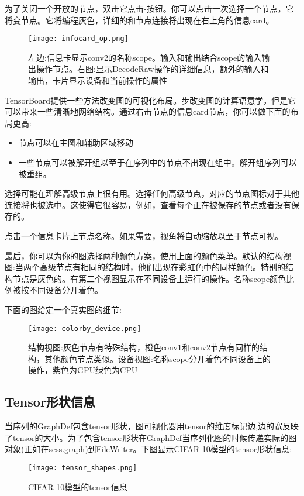 为了关闭一个开放的节点，双击它点击-按钮。你可以点击一次选择一个节点，它将变节点。它将编程灰色，详细的和节点连接将出现在右上角的信息card。
\begin{figure}[H]
\centering
\texttt{[image: infocard\_op.png]}
\caption{左边:信息卡显示conv2的名称scope。输入和输出结合scope的输入输出操作节点。右图:显示DecodeRaw操作的详细信息，额外的输入和输出，卡片显示设备和当前操作的属性}
\end{figure}
TensorBoard提供一些方法改变图的可视化布局。步改变图的计算语意学，但是它可以带来一些清晰地网络结构。通过右击节点的信息card节点，你可以做下面的布局更高:
\begin{itemize}
\item 节点可以在主图和辅助区域移动
\item 一些节点可以被解开组以至于在序列中的节点不出现在组中。解开组序列可以被重组。
\end{itemize}
选择可能在理解高级节点上很有用。选择任何高级节点，对应的节点图标对于其他连接将也被选中。这使得它很容易，例如，查看每个正在被保存的节点或者没有保存的。

点击一个信息卡片上节点名称。如果需要，视角将自动缩放以至于节点可视。

最后，你可以为你的图选择两种颜色方案，使用上面的颜色菜单。默认的结构视图:当两个高级节点有相同的结构时，他们出现在彩虹色中的同样颜色。特别的结构节点是灰色的。有第二个视图显示在不同设备上运行的操作。名称scope颜色比例被按不同设备分开着色。

下面的图给定一个真实图的细节:
\begin{figure}[H]
\centering
\texttt{[image: colorby\_device.png]}
\caption{结构视图:灰色节点有特殊结构，橙色conv1和conv2节点有同样的结构，其他颜色节点类似。设备视图:名称scope分开着色不同设备上的操作，紫色为GPU绿色为CPU}
\end{figure}
\subsection{Tensor形状信息}
当序列的GraphDef包含tensor形状，图可视化器用tensor的维度标记边,边的宽反映了tensor的大小。为了包含tensor形状在GraphDef当序列化图的时候传递实际的图对象(正如在sess.graph)到FileWriter。下图显示CIFAR-10模型的tensor形状信息:
\begin{figure}[H]
\centering
\texttt{[image: tensor\_shapes.png]}
\caption{CIFAR-10模型的tensor信息}
\end{figure}

